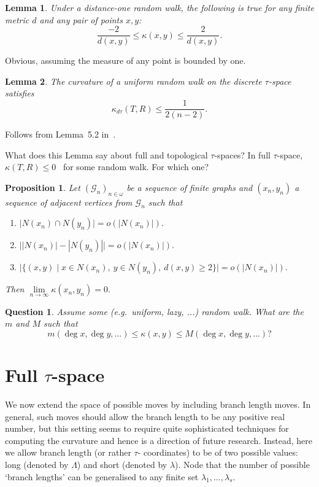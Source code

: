 \documentclass{amsart}
\newtheorem{lemma}{Lemma}
\newtheorem{question}{Question}
\newtheorem{proposition}{Proposition}
\begin{document}
\begin{lemma}
Under a distance-one random walk, the following is true for any finite 
metric $d$ and any pair of points $x,y$:
\[
\dfrac{-2}{d(x,y)} \leq \kappa(x,y) \leq \dfrac{2}{d(x,y)}.
\]
\end{lemma}

\proof
Obvious, assuming the measure of any point is bounded by one. 
\endproof


\begin{lemma}
The curvature of a uniform random walk on the discrete $\tau$-space satisfies 
\[
\kappa_{d\tau}(T,R) \leq 
\dfrac{1}{2(n-2)}.
\]
\end{lemma}

\proof
Follows from Lemma~5.2 in~\cite{WhiddenMatsen}. 
\endproof

What does this Lemma say about full and topological $\tau$-spaces? 
In full $\tau$-space, $\kappa(T,R) \leq 0$~\cite{GD} for some random walk. 
For which one? 

\begin{proposition}
Let $(\mathcal G_n)_{n \in \omega}$ be a sequence of finite graphs and 
$(x_n, y_n)$ a sequence of adjacent vertices from $\mathcal G_n$ such that
\begin{enumerate}[(1)]
\item $\big|N(x_n) \cap N(y_n)\big| = o(|N(x_n)|).$ 
\item $\big||N(x_n)| - |N(y_n)|\big| = o(|N(x_n)|).$ 
\item $\big|\{(x,y) \mid x \in N(x_n),~ y \in N(y_n),~ d(x, y) \geq 2\}\big| 
= o(|N(x_n)|).$
\end{enumerate}

Then $\lim\limits_{n \to \infty} \kappa(x_n, y_n) = 0.$
\end{proposition}

\proof

\endproof

\begin{question}
Assume some (e.g.\ uniform, lazy, ...) random walk. What are the $m$ and $M$ 
such that 
\[
m(\deg x,\deg y, \ldots) \leq \kappa(x,y) \leq M(\deg x, \deg y, \ldots)? 
\]
\end{question}

\section{Full $\tau$-space}

We now extend the space of possible moves by including branch length moves. 
In general, such moves should allow the branch length to be any positive real 
number, but this setting seems to require quite sophisticated techniques for 
computing the curvature and hence is a direction of future research. 
Instead, here we allow branch length (or rather $\tau$- coordinates) 
to be of two possible values: long (denoted by $\Lambda$) and short (denoted 
by $\lambda$). Node that the number of possible `branch lengths' can be 
generalised to any finite set $\lambda_1,\ldots,\lambda_s$.
\end{document}
